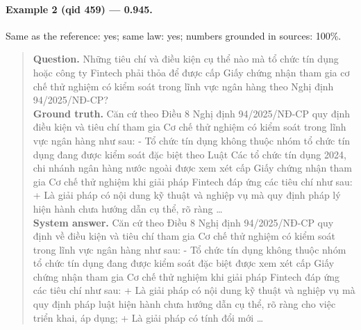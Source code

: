 \paragraph{Example 2 (qid 459) --- \rl{} 0.945.} Same \dieu{} as the reference: yes; same law: yes; numbers grounded in sources: 100\%.
\begin{quote}\small\textbf{Question.} Những tiêu chí và điều kiện cụ thể nào mà tổ chức tín dụng hoặc công ty Fintech phải thỏa để được cấp Giấy chứng nhận tham gia cơ chế thử nghiệm có kiểm soát trong lĩnh vực ngân hàng theo Nghị định 94/2025/NĐ-CP?\\[2pt]
\textbf{Ground truth.} Căn cứ theo Điều 8 Nghị định 94/2025/NĐ-CP quy định điều kiện và tiêu chí tham gia Cơ chế thử nghiệm có kiểm soát trong lĩnh vực ngân hàng như sau: - Tổ chức tín dụng không thuộc nhóm tổ chức tín dụng đang được kiểm soát đặc biệt theo Luật Các tổ chức tín dụng 2024, chi nhánh ngân hàng nước ngoài được xem xét cấp Giấy chứng nhận tham gia Cơ chế thử nghiệm khi giải pháp Fintech đáp ứng các tiêu chí như sau: + Là giải pháp có nội dung kỹ thuật và nghiệp vụ mà quy định pháp lý hiện hành chưa hướng dẫn cụ thể, rõ ràng …\\[2pt]
\textbf{System answer.} Căn cứ theo Điều 8 Nghị định 94/2025/NĐ-CP quy định về điều kiện và tiêu chí tham gia Cơ chế thử nghiệm có kiểm soát trong lĩnh vực ngân hàng như sau: - Tổ chức tín dụng không thuộc nhóm tổ chức tín dụng đang được kiểm soát đặc biệt được xem xét cấp Giấy chứng nhận tham gia Cơ chế thử nghiệm khi giải pháp Fintech đáp ứng các tiêu chí như sau: + Là giải pháp có nội dung kỹ thuật và nghiệp vụ mà quy định pháp luật hiện hành chưa hướng dẫn cụ thể, rõ ràng cho việc triển khai, áp dụng; + Là giải pháp có tính đổi mới …\end{quote}

